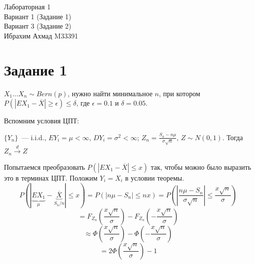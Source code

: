 \documentclass[12pt,a4paper]{article}
\begin{document}
\begin{center}
\large Лабораторная 1 \\
\normalsize Вариант 1 (Задание 1)\\
\normalsize Вариант 3 (Задание 2)\\
\normalsize Ибрахим Ахмад M33391 \\
\end{center}
\section*{Задание 1}
\par $X_{1} \ldots X_{n} \sim Bern(p)$, нужно найти минимальное $n$, при котором
$P(|EX_{1}-\overline{X}| \geq \epsilon) \leq \delta$, где $\epsilon=0.1$ и
$\delta=0.05$.

\par Вспомним условия ЦПТ:
\par $\{Y_{n}\}$~--- i.i.d., $EY_{i}=\mu<\infty$, $DY_{i}=\sigma^2<\infty$;
    $Z_{n}=\frac{S_{n}-n\mu}{\sigma \sqrt{n}}$, $Z \sim N(0,1)$.
    Тогда $Z_{n} \xrightarrow{d} Z$

\par Попытаемся преобразовать $P(|EX_{1}-\overline{X}| \leq x)$ так, чтобы можно
было выразить это в терминах ЦПТ. Положим $Y_{i}=X_{i}$ в условии теоремы.
$$P(|\underbrace{EX_{1}}_{\mu}-\underbrace{\overline{X}}_{S_{n}/n}| \leq x)
  =P(|n\mu-S_{n}| \leq nx)
  =P\left(\left|\frac{n\mu-S_{n}}{\sigma \sqrt{n}}\right| \leq \frac{x
      \sqrt{n}}{\sigma}\right)$$
$$=F_{Z_n}\left(\frac{x \sqrt{n}}{\sigma}\right)-F_{Z_n}\left(-\frac{x \sqrt{n}}{\sigma}\right)$$
$$\approx \Phi\left(\frac{x \sqrt{n}}{\sigma}\right) - \Phi\left(-\frac{x \sqrt{n}}{\sigma}\right)$$
$$=2\Phi\left(\frac{x \sqrt{n}}{\sigma}\right) - 1$$
\end{document}
